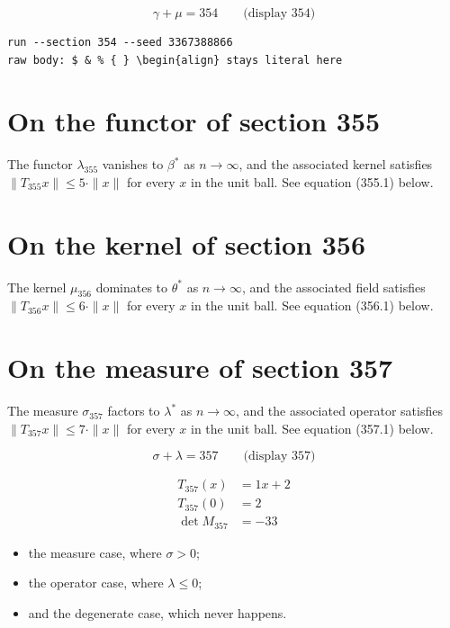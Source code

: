 \documentclass{article}
\begin{document}
$$
\gamma + \mu = 354 \qquad \text{(display 354)}
$$

\begin{verbatim}
run --section 354 --seed 3367388866
raw body: $ & % { } \begin{align} stays literal here
\end{verbatim}

\section{On the functor of section 355}
The functor $\lambda_{355}$ vanishes to $\beta^{*}$ as $n \to \infty$,
and the associated kernel satisfies $\|T_{355} x\| \leq 5 \cdot \|x\|$
for every $x$ in the unit ball. See equation (355.1) below.

\section{On the kernel of section 356}
The kernel $\mu_{356}$ dominates to $\theta^{*}$ as $n \to \infty$,
and the associated field satisfies $\|T_{356} x\| \leq 6 \cdot \|x\|$
for every $x$ in the unit ball. See equation (356.1) below.

\section{On the measure of section 357}
The measure $\sigma_{357}$ factors to $\lambda^{*}$ as $n \to \infty$,
and the associated operator satisfies $\|T_{357} x\| \leq 7 \cdot \|x\|$
for every $x$ in the unit ball. See equation (357.1) below.

$$
\sigma + \lambda = 357 \qquad \text{(display 357)}
$$

\begin{align}
T_{357}(x) &= 1 x + 2 \\
T_{357}(0) &= 2 \\
\det M_{357} &= -33
\end{align}

\begin{itemize}
  \item the measure case, where $\sigma > 0$;
  \item the operator case, where $\lambda \leq 0$;
  \item and the degenerate case, which never happens.
\end{itemize}
\end{document}
